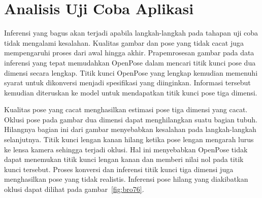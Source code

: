 \section{Analisis Uji Coba Aplikasi} \label{sec:4-PersiapanPengujian}

Inferensi yang bagus akan terjadi apabila langkah-langkah pada tahapan uji coba tidak mengalami
kesalahan. Kualitas gambar dan pose yang tidak cacat juga mempengaruhi proses dari awal hingga akhir.
Prapemrosesan gambar pada data inferensi yang tepat memudahkan OpenPose dalam mencari titik kunci
pose dua dimensi secara lengkap. Titik kunci OpenPose yang lengkap kemudian memenuhi syarat untuk
dikonversi menjadi spesifikasi yang diinginkan. Informasi tersebut kemudian diteruskan ke model
untuk mendapatkan titik kunci pose tiga dimensi.


Kualitas pose yang cacat menghasilkan estimasi pose tiga dimensi yang cacat. Oklusi pose pada gambar
dua dimensi dapat menghilangkan suatu bagian tubuh. Hilangnya bagian ini dari gambar menyebabkan
kesalahan pada langkah-langkah selanjutnya. Titik kunci lengan kanan hilang ketika pose lengan
mengarah lurus ke lensa kamera sehingga terjadi oklusi. Hal ini menyebabkan OpenPose tidak dapat
menemukan titik kunci lengan kanan dan memberi nilai nol pada titik kunci tersebut. Proses konversi
dan inferensi titik kunci tiga dimensi juga menghasilkan pose yang tidak realistis. Inferensi pose
hilang yang diakibatkan oklusi dapat dilihat pada gambar~\ref{fig:bro76}.

